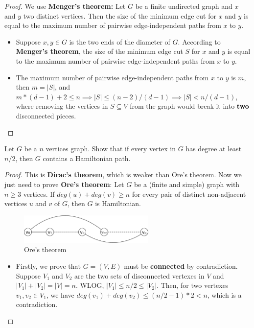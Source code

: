 \documentclass{article}
\newcounter{exercise}
\newcommand{\<}{
    \langle}
\renewcommand{\>}{
    \rangle}
\begin{document}
{\begin{proof}
We use \textbf{Menger's theorem:} Let $G$ be a finite undirected graph and $x$ and $y$ two distinct vertices. Then the size of the minimum edge cut for $x$ and $y$ is equal to the maximum number of pairwise edge-independent paths from $x$ to $y$.
\begin{itemize}
    \item Suppose $x,y\in G$ is the two ends of the diameter of $G$. According to \textbf{Menger's theorem}, the size of the minimum edge cut $S$ for $x$ and $y$ is equal to the maximum number of pairwise edge-independent paths from $x$ to $y$.
    \item The maximum number of pairwise edge-independent paths from $x$ to $y$ is $m$, then $m=|S|$, and $m*(d-1)+2\leq n\implies |S|\leq (n-2)/(d-1) \implies |S| < n/(d-1)$, where removing the vertices in $S\subseteq V$ from the graph would break it into \textbf{two} disconnected pieces.
\end{itemize}

\end{proof}




\begin{exercise}
Let $G$ be a $n$ vertices graph. Show that if every vertex in $G$ has degree at least $n/2$, then $G$ contains a Hamiltonian path.
\end{exercise}
\begin{proof} This is \textbf{Dirac's theorem}, which is weaker than Ore's theorem. Now we just need to prove \textbf{Ore's theorem}: Let $G$ be a (finite and simple) graph with $n \geq 3$ vertices. If $deg(u)+deg(v) \geq n$ for every pair of distinct non-adjacent vertices $u$ and $v$ of $G$, then $G$ is Hamiltonian.
    \begin{figure}[!htp]
        \centering
        \includegraphics[width=0.6\textwidth]{img/3.pdf}
        \caption{Ore's theorem}
        \label{fig:3}
      \end{figure}

    \begin{itemize}
        \item Firstly, we prove that $G=(V,E)$ must be \textbf{connected} by contradiction. Suppose $V_1$ and $V_2$ are the two sets of disconnected vertexes in $V$ and $|V_1|+|V_2|=|V|=n$. WLOG, $|V_1| \leq n/2 \leq |V_2|$. Then, for two vertexes $v_1,v_2 \in V_1$, we have $deg(v_1)+deg(v_2) \leq (n/2-1)*2 < n$, which is a contradiction.
        

\end{itemize}
\end{proof}}
\end{document}
